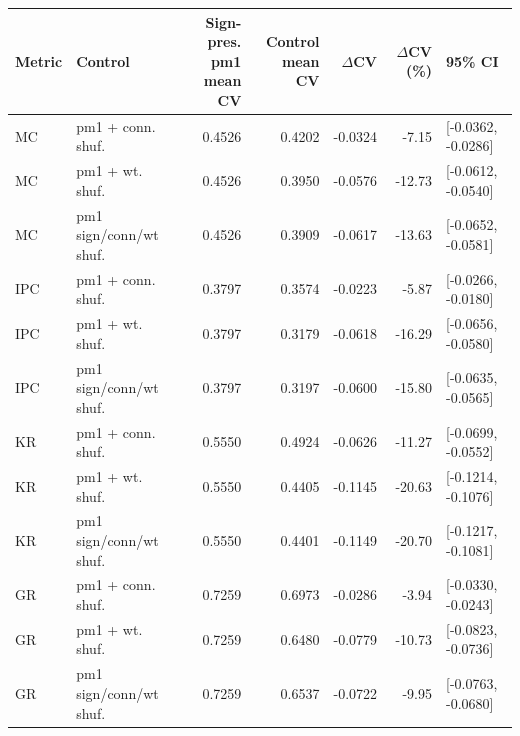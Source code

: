 \begin{tabular}{llrrrrl}
\toprule
Metric & Control & Sign-pres. pm1 mean CV & Control mean CV & $\Delta$CV & $\Delta$CV (\%) & 95\% CI \\
\midrule
MC & pm1 + conn. shuf. & 0.4526 & 0.4202 & -0.0324 & -7.15 & [-0.0362, -0.0286] \\
MC & pm1 + wt. shuf. & 0.4526 & 0.3950 & -0.0576 & -12.73 & [-0.0612, -0.0540] \\
MC & pm1 sign/conn/wt shuf. & 0.4526 & 0.3909 & -0.0617 & -13.63 & [-0.0652, -0.0581] \\
IPC & pm1 + conn. shuf. & 0.3797 & 0.3574 & -0.0223 & -5.87 & [-0.0266, -0.0180] \\
IPC & pm1 + wt. shuf. & 0.3797 & 0.3179 & -0.0618 & -16.29 & [-0.0656, -0.0580] \\
IPC & pm1 sign/conn/wt shuf. & 0.3797 & 0.3197 & -0.0600 & -15.80 & [-0.0635, -0.0565] \\
KR & pm1 + conn. shuf. & 0.5550 & 0.4924 & -0.0626 & -11.27 & [-0.0699, -0.0552] \\
KR & pm1 + wt. shuf. & 0.5550 & 0.4405 & -0.1145 & -20.63 & [-0.1214, -0.1076] \\
KR & pm1 sign/conn/wt shuf. & 0.5550 & 0.4401 & -0.1149 & -20.70 & [-0.1217, -0.1081] \\
GR & pm1 + conn. shuf. & 0.7259 & 0.6973 & -0.0286 & -3.94 & [-0.0330, -0.0243] \\
GR & pm1 + wt. shuf. & 0.7259 & 0.6480 & -0.0779 & -10.73 & [-0.0823, -0.0736] \\
GR & pm1 sign/conn/wt shuf. & 0.7259 & 0.6537 & -0.0722 & -9.95 & [-0.0763, -0.0680] \\
\bottomrule
\end{tabular}
